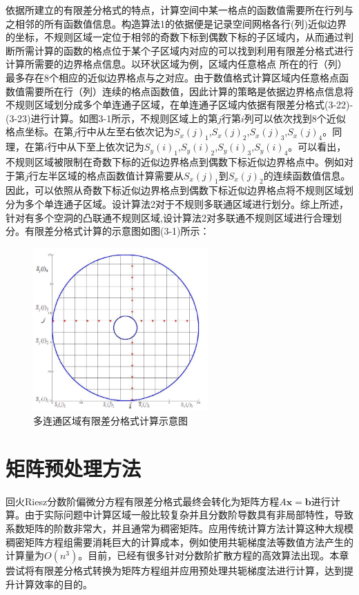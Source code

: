 \documentclass[twoside,UTF8]{nputhesis}
\begin{document}
依据所建立的有限差分格式的特点，计算空间中某一格点的函数值需要所在行列与之相邻的所有函数值信息。构造算法1的依据便是记录空间网格各行(列)近似边界的坐标，不规则区域一定位于相邻的奇数下标到偶数下标的子区域内，从而通过判断所需计算的函数的格点位于某个子区域内对应的可以找到利用有限差分格式进行计算所需要的边界格点信息。以环状区域为例，区域内任意格点 所在的行（列）最多存在8个相应的近似边界格点与之对应。由于数值格式计算区域内任意格点函数值需要所在行（列）连续的格点函数值，因此计算的策略是依据边界格点信息将不规则区域划分成多个单连通子区域，在单连通子区域内依据有限差分格式(3-22)-(3-23)进行计算。如图3-1所示，不规则区域上的第$j$行第$i$列可以依次找到8个近似格点坐标。在第$j$行中从左至右依次记为${{S}_{x}}(j)_{1}$,${{S}_{x}}(j)_{2}$,${{S}_{x}}(j)_{3}$,${{S}_{x}}(j)_{4}$。同理，在第$i$行中从下至上依次记为${{S}_{y}}(i)_{1}$,${{S}_{y}}(i)_{2}$,${{S}_{y}}(i)_{3}$,${{S}_{y}}(i)_{4}$。可以看出，不规则区域被限制在奇数下标的近似边界格点到偶数下标近似边界格点中。例如对于第$j$行左半区域的格点函数值计算需要从${{S}_{x}}(j)_{1}$到${{S}_{x}}(j)_{2}$的连续函数值信息。因此，可以依照从奇数下标近似边界格点到偶数下标近似边界格点将不规则区域划分为多个单连通子区域。设计算法2对于不规则多联通区域进行划分。综上所述，针对有多个空洞的凸联通不规则区域,设计算法2对多联通不规则区域进行合理划分。有限差分格式计算的示意图如图(3-1)所示：


\begin{figure}[htb]
	\centering
	\includegraphics[width=0.6\textwidth,height=0.6\textwidth]{figures/Loop.jpg}
	\hspace{0.6\textwidth}
	\caption{多连通区域有限差分格式计算示意图}
	\label{FCR} 
\end{figure}



\section{矩阵预处理方法}
回火Riesz分数阶偏微分方程有限差分格式最终会转化为矩阵方程$A\bm{x}=\bm{b}$进行计算。由于实际问题中计算区域一般比较复杂并且分数阶导数具有非局部特性，导致系数矩阵的阶数非常大，并且通常为稠密矩阵。应用传统计算方法计算这种大规模稠密矩阵方程组需要消耗巨大的计算成本，例如使用共轭梯度法等数值方法产生的计算量为$O({{n}^{3}})$。目前，已经有很多针对分数阶扩散方程的高效算法出现。本章尝试将有限差分格式转换为矩阵方程组并应用预处理共轭梯度法进行计算，达到提升计算效率的目的。
\end{document}
